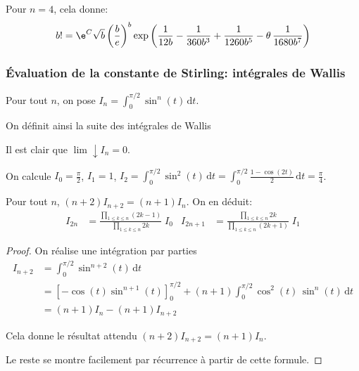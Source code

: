 Pour $n=4$, cela donne:
\[
b! = \e^C \sqrt{b} \left ( \frac{b}{e}\right )^b \exp\left ( \frac{1}{12 b} - \frac{1}{360b^3} + \frac{1}{1260 b^5} - \theta \, \frac{1}{1680 b^7} \right )
\]

\subsubsection{Évaluation de la constante de Stirling: intégrales de Wallis}


\begin{de}
Pour tout $n$, on pose $I_n = \displaystyle{\int_0^{\pi/2}} \sin^n (t) \, \mathrm d t$.

\medskip
On définit ainsi la suite des intégrales de Wallis
\end{de}

\begin{listremarques}
\item
Il est clair que $\lim \downarrow I_n = 0$.
\item
On calcule $I_0 = \frac{\pi}{2}$, $I_1 = 1$, $I_2 = \displaystyle{\int_0^{\pi/2}} \sin^2 (t) \, \mathrm d t = \displaystyle{\int_0^{\pi/2}} \frac{1-\cos(2t)}{2} \, \mathrm d t = \frac{\pi}{4}$.
\end{listremarques}

\begin{prop}
Pour tout $n$, $(n+2) I_{n+2} = (n+1) I_n$. On en déduit:
\begin{align*}
I_{2n} & =  \frac{\prod \limits_{1 \leq k \leq n} (2k-1)}{\prod \limits_{1 \leq k \leq n} 2k} \; I_0 &
I_{2n+1} & = \frac{\prod \limits_{1 \leq k \leq n} 2k}{\prod \limits_{1 \leq k \leq n} (2k+1)} \; I_1
\end{align*}
\end{prop}


\begin{proof}
On réalise une intégration par parties
\begin{align*}
I_{n+2} & = \displaystyle{\int_0^{\pi/2}} \sin^{n+2} (t) \, \mathrm d t \\
 & = \left [ -\cos(t) \sin^{n+1}(t) \right ]_0^{\pi/2} + (n+1) \displaystyle{\int_0^{\pi/2}} \cos^2(t) \, \sin^{n} (t) \, \mathrm d t \\
 & = (n+1) I_n - (n+1) I_{n+2}
\end{align*}

Cela donne le résultat attendu $(n+2) I_{n+2} = (n+1) I_n$.

\medskip
Le reste se montre facilement par récurrence à partir de cette formule.
\end{proof}

